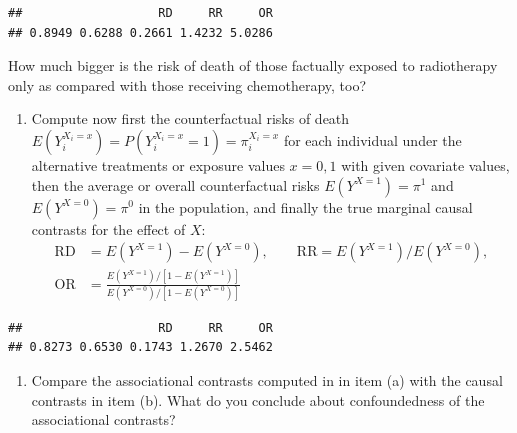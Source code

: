 \documentclass[
]{book}
\newenvironment{Shaded}{\begin{snugshade}}{\end{snugshade}}
\newcommand{\AttributeTok}[1]{\textcolor[rgb]{0.13,0.29,0.53}{#1}}
\newcommand{\DecValTok}[1]{\textcolor[rgb]{0.00,0.00,0.81}{#1}}
\newcommand{\FunctionTok}[1]{\textcolor[rgb]{0.13,0.29,0.53}{\textbf{#1}}}
\newcommand{\NormalTok}[1]{#1}
\newcommand{\OtherTok}[1]{\textcolor[rgb]{0.56,0.35,0.01}{#1}}
\newcommand{\SpecialCharTok}[1]{\textcolor[rgb]{0.81,0.36,0.00}{\textbf{#1}}}
\providecommand{\tightlist}{%
  \setlength{\itemsep}{0pt}\setlength{\parskip}{0pt}}
\begin{document}
\begin{verbatim}
##                   RD     RR     OR 
## 0.8949 0.6288 0.2661 1.4232 5.0286
\end{verbatim}

How much bigger is the risk of death of those factually exposed to
radiotherapy only as compared with those receiving chemotherapy, too?

\begin{enumerate}
\def\labelenumi{\arabic{enumi}.}
\setcounter{enumi}{1}
\tightlist
\item
  Compute now first the counterfactual risks of death
  \(E(Y_i^{X_i=x}) = P(Y_i^{X_i=x}=1) = \pi_i^{X_i=x}\) for each
  individual under the alternative treatments or exposure values
  \(x=0,1\) with given covariate values, then the average or overall
  counterfactual risks \(E(Y^{X=1}) = \pi^1\) and \(E(Y^{X=0}) = \pi^0\)
  in the population, and finally the true marginal causal contrasts
  for the effect of \(X\): \[
  \begin{aligned}
   \text{RD} & = E(Y^{X=1})-E(Y^{X=0}), \qquad  \text{RR} = E(Y^{X=1})/E(Y^{X=0}), \\
   \text{OR} & = \frac{E(Y^{X=1})/[1 -  E(Y^{X=1})]}{E(Y^{X=0})/[1 -  E(Y^{X=0})] }
  \end{aligned}
  \]
\end{enumerate}

\begin{Shaded}
\end{Shaded}

\begin{verbatim}
##                   RD     RR     OR 
## 0.8273 0.6530 0.1743 1.2670 2.5462
\end{verbatim}

\begin{enumerate}
\def\labelenumi{\arabic{enumi}.}
\setcounter{enumi}{2}
\tightlist
\item
  Compare the associational contrasts computed in in item (a) with the
  causal contrasts in item (b). What do you conclude about
  confoundedness of the associational contrasts?
\end{enumerate}
\end{document}
